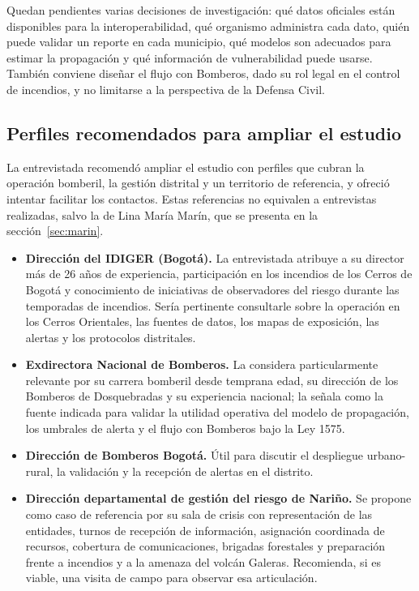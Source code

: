 Quedan pendientes varias decisiones de investigación: qué datos oficiales están disponibles para la interoperabilidad, qué organismo administra cada dato, quién puede validar un reporte en cada municipio, qué modelos son adecuados para estimar la propagación y qué información de vulnerabilidad puede usarse. También conviene diseñar el flujo con Bomberos, dado su rol legal en el control de incendios, y no limitarse a la perspectiva de la Defensa Civil.

\subsection{Perfiles recomendados para ampliar el estudio}

La entrevistada recomendó ampliar el estudio con perfiles que cubran la operación bomberil, la gestión distrital y un territorio de referencia, y ofreció intentar facilitar los contactos. Estas referencias no equivalen a entrevistas realizadas, salvo la de Lina María Marín, que se presenta en la sección~\ref{sec:marin}.

\begin{itemize}
  \item \textbf{Dirección del IDIGER (Bogotá).} La entrevistada atribuye a su director más de 26 años de experiencia, participación en los incendios de los Cerros de Bogotá y conocimiento de iniciativas de observadores del riesgo durante las temporadas de incendios. Sería pertinente consultarle sobre la operación en los Cerros Orientales, las fuentes de datos, los mapas de exposición, las alertas y los protocolos distritales.
  \item \textbf{Exdirectora Nacional de Bomberos.} La considera particularmente relevante por su carrera bomberil desde temprana edad, su dirección de los Bomberos de Dosquebradas y su experiencia nacional; la señala como la fuente indicada para validar la utilidad operativa del modelo de propagación, los umbrales de alerta y el flujo con Bomberos bajo la Ley 1575.
  \item \textbf{Dirección de Bomberos Bogotá.} Útil para discutir el despliegue urbano-rural, la validación y la recepción de alertas en el distrito.
  \item \textbf{Dirección departamental de gestión del riesgo de Nariño.} Se propone como caso de referencia por su sala de crisis con representación de las entidades, turnos de recepción de información, asignación coordinada de recursos, cobertura de comunicaciones, brigadas forestales y preparación frente a incendios y a la amenaza del volcán Galeras. Recomienda, si es viable, una visita de campo para observar esa articulación.
\end{itemize}

